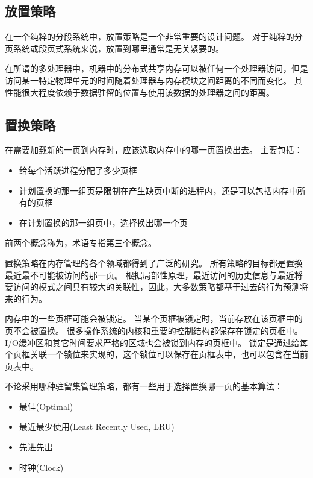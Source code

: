 {    \subsection{放置策略}
    {
        在一个纯粹的分段系统中，放置策略是一个非常重要的设计问题。
        对于纯粹的分页系统或段页式系统来说，放置到哪里通常是无关紧要的。

        在所谓的多处理器中，机器中的分布式共享内存可以被任何一个处理器访问，但是访问某一特定物理单元的时间随着处理器与内存模块之间距离的不同而变化。
        其性能很大程度依赖于数据驻留的位置与使用该数据的处理器之间的距离。
    }

    \subsection{置换策略}
    {
        在需要加载新的一页到内存时，应该选取内存中的哪一页置换出去。
        主要包括：

        \begin{itemize}
            \item 给每个活跃进程分配了多少页框
            \item 计划置换的那一组页是限制在产生缺页中断的进程内，还是可以包括内存中所有的页框
            \item 在计划置换的那一组页中，选择换出哪一个页
        \end{itemize}

        前两个概念称为，术语专指第三个概念。

        置换策略在内存管理的各个领域都得到了广泛的研究。
        所有策略的目标都是置换最近最不可能被访问的那一页。
        根据局部性原理，最近访问的历史信息与最近将要访问的模式之间具有较大的关联性，因此，大多数策略都基于过去的行为预测将来的行为。

        {
            内存中的一些页框可能会被锁定。
            当某个页框被锁定时，当前存放在该页框中的页不会被置换。
            很多操作系统的内核和重要的控制结构都保存在锁定的页框中。
            I/O缓冲区和其它时间要求严格的区域也会被锁到内存的页框中。
            锁定是通过给每个页框关联一个锁位来实现的，这个锁位可以保存在页框表中，也可以包含在当前页表中。
        }

        {
            不论采用哪种驻留集管理策略，都有一些用于选择置换哪一页的基本算法：

            \begin{itemize}
                \item 最佳(Optimal)
                \item 最近最少使用(Least Recently Used, LRU)
                \item 先进先出
                \item 时钟(Clock)
            \end{itemize}
        }

}}
